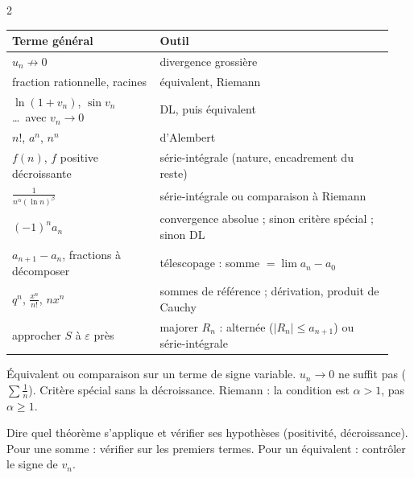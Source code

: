 \documentclass[a4paper,10pt]{article}
\newcommand{\sous}[1]{\par\needspace{6\baselineskip}\vspace{0.25em}\noindent{\sffamily\bfseries\small\color{BleuMoyen}#1}\par\nobreak}
\begin{document}
\begin{multicols}{2}
\sous{Je vois\dots\ je fais\dots}
{\small\renewcommand{\arraystretch}{1.16}
\begin{tabular}{@{}>{\raggedright\arraybackslash}p{0.36\linewidth}>{\raggedright\arraybackslash}p{0.58\linewidth}@{}}
\toprule
\textsf{\scriptsize Terme général} & \textsf{\scriptsize Outil}\\\midrule
$u_n\not\to0$ & divergence grossière\\
fraction rationnelle, racines & équivalent, Riemann\\
$\ln(1+v_n)$, $\sin v_n$\dots\ avec $v_n\to0$ & DL, puis équivalent\\
$n!$, $a^n$, $n^n$ & d'Alembert\\
$f(n)$, $f$ positive décroissante & série-intégrale (nature, encadrement du reste)\\
$\frac1{n^\alpha(\ln n)^\beta}$ & série-intégrale ou comparaison à Riemann\\
$(-1)^na_n$ & convergence absolue ; sinon critère spécial ; sinon DL\\
$a_{n+1}-a_n$, fractions à décomposer & télescopage : somme $=\lim a_n-a_0$\\
$q^n$, $\frac{x^n}{n!}$, $nx^n$ & sommes de référence ; dérivation, produit de Cauchy\\
approcher $S$ à $\varepsilon$ près & majorer $R_n$ : alternée ($|R_n|\leq a_{n+1}$) ou série-intégrale\\
\bottomrule
\end{tabular}}

\begin{PIEGE}
Équivalent ou comparaison sur un terme de signe variable. $u_n\to0$ ne suffit pas ($\sum\frac1n$).
Critère spécial sans la décroissance. Riemann : la condition est $\alpha>1$, pas $\alpha\geq1$.
\end{PIEGE}

\begin{REFL}
Dire quel théorème s'applique et vérifier ses hypothèses (positivité, décroissance). Pour une somme : vérifier sur les
premiers termes. Pour un équivalent : contrôler le signe de $v_n$.
\end{REFL}

\end{multicols}
\end{document}
